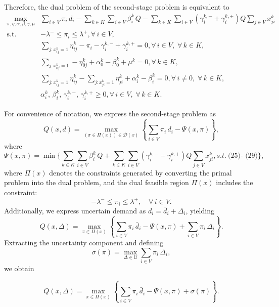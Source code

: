 \documentclass[preprint,12pt,authoryear]{elsarticle}
\begin{document}
Therefore, the dual problem of the second-stage problem is equivalent to
\begin{align*}
\max_{\pi,\eta,\alpha,\beta,\gamma,\mu} & \sum_{i\in V} \pi_i\, d_i - \sum_{k\in K}\sum_{i\in V} \beta_i^k\, Q - \sum_{k\in K}\sum_{i\in V} \left(\gamma_i^{k,-} + \gamma_i^{k,+}\right) Q \sum_{j\in V} x_{ji}^k \\
\text{s.t.} & -\lambda^- \le \pi_i \le \lambda^+, \forall\, i\in V, \\ 
& \sum_{j: x_{ij}^k=1} \eta_{ij}^k - \pi_i - \gamma_i^{k,-} + \gamma_i^{k,+} = 0, \forall\, i\in V,\; \forall\, k\in K, \\
& \sum_{j: x_{0j}^k=1} -\eta_{0j}^k + \alpha_0^k - \beta_0^k + \mu^k = 0,\forall\, k\in K, \\
& \sum_{j: x_{ij}^k=1} \eta_{ij}^k - \sum_{j: x_{ji}^k=1} \eta_{ji}^k + \alpha_i^k - \beta_i^k = 0, \forall\, i\neq 0,\; \forall\, k\in K, \\ 
& \alpha_i^k,\, \beta_i^k,\, \gamma_i^{k,-},\, \gamma_i^{k,+} \ge 0, \forall\, i\in V,\; \forall\, k\in K.
\end{align*}

For convenience of notation, we express the second-stage problem as
\begin{equation*}
    Q(x,d) = \max_{(\pi\in\Pi(x)) \in \mathcal{D}(x)} \left\{ \sum_{i\in V} \pi_i\, d_i - \Psi(x,\pi) \right\},
\end{equation*} where
\begin{equation*}
\Psi(x,\pi) = \min \Biggl\{ \sum_{k\in K}\sum_{i\in V} \beta_i^k\, Q + \sum_{k\in K}\sum_{i\in V} \left(\gamma_i^{k,-}+\gamma_i^{k,+}\right) Q \sum_{j\in V} x_{ji}^k , s.t. ~\text{(25)- (29)} \Biggr\},
\end{equation*}
where $\Pi(x) $ denotes the constraints generated by converting the primal problem into the dual problem, and the dual feasible region $\Pi(x)$ includes the constraint:
\begin{equation*}
-\lambda^- \le \pi_i \le \lambda^+, \quad \forall\, i\in V.
\end{equation*}
Additionally, we express uncertain demand as \( d_i=\bar{d}_i+\Delta_i \), yielding
\begin{equation*}
Q(x,\Delta)=\max_{\pi\in \Pi(x)} \left\{ \sum_{i\in V} \pi_i\, \bar{d}_i - \Psi(x,\pi) + \sum_{i\in V}\pi_i\,\Delta_i \right\}.
\end{equation*}
Extracting the uncertainty component and defining
\begin{equation*}
\sigma(\pi)=\max_{\Delta\in \mathcal{U}} \sum_{i\in V}\pi_i\,\Delta_i,
\end{equation*} we obtain

\begin{equation*}
Q(x,\Delta)=\max_{\pi\in \Pi(x)} \left\{ \sum_{i\in V} \pi_i\, \bar{d}_i - \Psi(x,\pi) + \sigma(\pi) \right\}.
\end{equation*}

 

\end{document}

